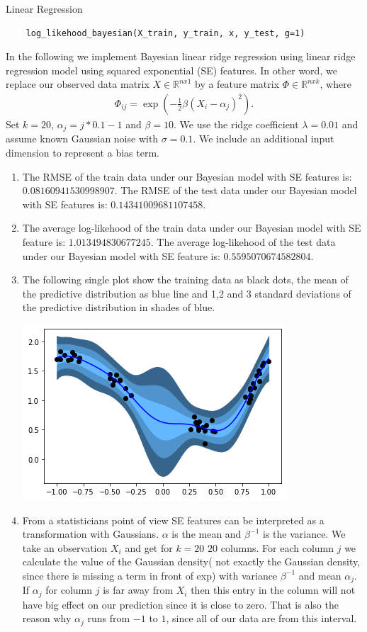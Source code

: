 \begin{task}{Linear Regression}
\begin{subtask}
\begin{lstlisting}
    log_likehood_bayesian(X_train, y_train, x, y_test, g=1)
\end{lstlisting}
\end{subtask}
\begin{subtask}
In the following we implement Bayesian linear ridge regression using linear ridge regression model using squared exponential (SE) features. In other word, we replace our observed data matrix $X \in \mathbb{R}^{nx1}$ by a feature matrix $\Phi \in \mathbb{R}^{nxk}$, where
\begin{align*}
\Phi_{ij} = \exp(- \frac{1}{2} \beta (X_i - \alpha_j)^2).
\end{align*}
Set $k = 20$, $\alpha_j = j * 0.1 - 1$ and $\beta = 10$. We use the ridge coefficient $\lambda = 0.01$ and assume known Gaussian noise with $\sigma = 0.1$. We include an additional input dimension to represent a bias term. 
\begin{enumerate}
\item The RMSE of the train data under our Bayesian model with SE features is: $0.08160941530998907$. The RMSE of the test data under our Bayesian model with SE features is: $0.14341009681107458$.
\item The average log-likehood of the train data under our Bayesian model with SE feature is: $1.013494830677245$. The average log-likehood of the test data under our Bayesian model with SE feature is:
$0.5595070674582804$.
\item The following single plot show the training data as black dots, the mean of the predictive distribution as blue line and 1,2 and 3 standard deviations of the predictive distribution in shades of blue.
\begin{center}
\includegraphics{Figure_1e.png}
\end{center}
\item From a statisticians point of view SE features can be interpreted as a transformation with Gaussians. $\alpha$ is the mean and $\beta^{-1}$ is the variance. We take an observation $X_i$ and get for $k=20$ $20$ columns. For each column $j$ we calculate the value of the Gaussian density( not exactly the Gaussian density, since there is missing a term in front of exp) with variance $\beta^{-1}$ and mean $\alpha_j$. If $\alpha_j$ for column $j$ is far away from $X_i$ then this entry in the column will not have big effect on our prediction since it is close to zero. That is also the reason why $\alpha_j$ runs from $-1$ to $1$, since all of our data are from this interval. 

\end{enumerate}
\end{subtask}
\end{task}
